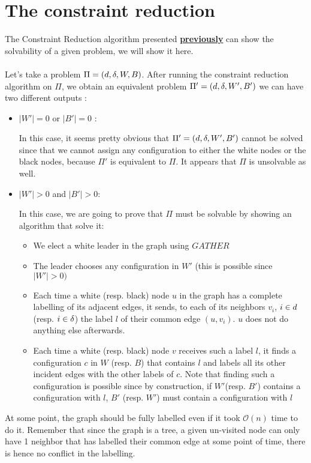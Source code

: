 \section{The constraint reduction}
The Constraint Reduction algorithm presented \hyperref[sec:CR]{\textbf{previously}} can show the solvability of a given problem, we will show it here.\\\\
Let's take a problem $\Pi = (d,\delta,W,B)$. After running the constraint reduction algorithm on $\Pi$, we obtain an equivalent problem $\Pi' = (d,\delta,W',B')$ we can have two different outputs :
\begin{itemize}
    \item $|W'| = 0$ or $|B'| = 0$ :
    
    In this case, it seems pretty obvious that $\Pi' = (d,\delta,W',B')$ cannot be solved since that we cannot assign any configuration to either the white nodes or the black nodes, because $\Pi'$ is equivalent to $\Pi$. It appears that $\Pi$ is unsolvable as well.
    \item  $|W'| > 0$ and $|B'| > 0$:
    
    In this case, we are going to prove that $\Pi$ must be solvable by showing an algorithm that solve it:
    \begin{itemize}
        \item We elect a white leader in the graph using $GATHER$
        \item The leader chooses any configuration in $W'$ (this is possible since $|W'|>0)$
        \item Each time a white (resp. black) node $u$ in the graph has a complete labelling of its adjacent edges, it sends, to each of its neighbors $v_i$, $i\in d$ (resp. $i\in\delta$) the label $l$ of their common edge $(u,v_i)$. $u$ does not do anything else afterwards.
        \item Each time a white (resp. black) node $v$ receives such a label $l$, it finds a configuration $c$ in $W$ (resp. $B$) that contains $l$ and labels all its other incident edges with the other labels of $c$. Note that finding such a configuration is possible since by construction, if $W'$(resp. $B'$) contains a configuration with $l$, $B'$ (resp. $W'$) must contain a configuration with $l$
    \end{itemize}
\end{itemize}

At some point, the graph should be fully labelled even if it took $\mathcal{O}(n)$ time to do it. Remember that since the graph is a tree, a given un-visited node can only have 1 neighbor that has labelled their common edge at some point of time, there is hence no conflict in the labelling.


